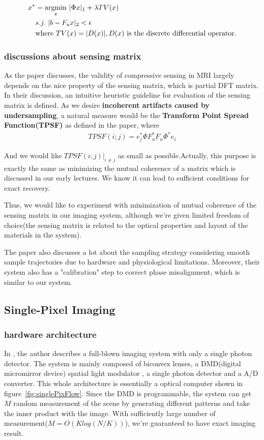 \documentclass{article} %
\begin{document}
\begin{align}
x^*&=\underset{x} {\mathrm{argmin}}~ |\Phi x|_1+\lambda TV(x) \\
\notag &s.j.~|b-F_ux|_2<\epsilon\\
\notag &\text{where}~TV(x)=|D(x)|, D(x) ~\text{is the discrete differential operator}. 
\label{eq:TV}
\end{align}

\subsubsection{discussions about sensing matrix}
As the paper discusses, the validity of compressive sensing in MRI largely depends on the nice property of the sensing matrix, which is partial DFT matrix. In their discussion, an intuitive heuristic guideline for evaluation of the sensing matrix is defined. As we desire \textbf{incoherent artifacts caused by undersampling}, a natural measure would be the \textbf{Transform Point Spread Function(TPSF)} as defined in the paper, where
\begin{align}
TPSF(i;j)=e_j^* \Phi F_u^* F_u \Phi^* e_i
\end{align}

And we would like $TPSF(i;j)|_{i \neq j}$ as small as possible.Actually, this purpose is exactly the same as minimizing the mutual coherence of a matrix which is discussed in our early lectures. We know it can lead to sufficient conditions for exact recovery. 

Thus, we would like to experiment with minimization of mutual coherence of the sensing matrix in our imaging system, although we're given limited freedom of choice(the sensing matrix is related to the optical properties and layout of the materials in the system).

The paper also discusses a lot about the sampling strategy considering smooth sample trajectories due to hardware and physiological limitations. Moreover, their system also has a "calibration" step to correct phase misalignment, which is similar to our system.

\subsection{Single-Pixel Imaging}
\subsubsection{hardware architecture}
In \cite{duarte2008single}, the author describes a full-blown imaging system with only a single photon detector.  The system is mainly composed of biconvex lenses, a DMD(digital micromirror device) spatial light modulator , a single photon detector and a A/D converter. This whole architecture is essentially a optical computer shown in figure~\ref{fig:singlePixFlow}. Since the DMD is programmable, the system can get $M$ random measurement of the scene by generating different patterns and take the inner product with the image. With sufficiently large number of measurement($M= O(K log(N/K))$), we're guaranteed to have exact imaging result. 
\end{document}
